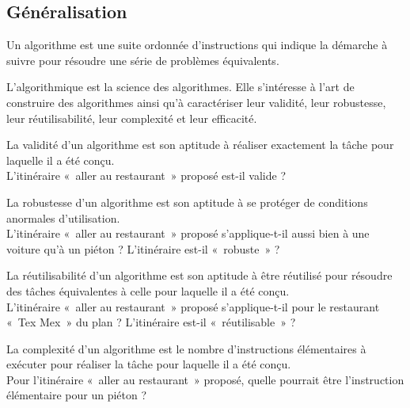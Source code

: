 \subsection{Généralisation}
Un algorithme est une suite ordonnée d'instructions qui indique la démarche à suivre pour résoudre une série de problèmes équivalents. 

L'algorithmique est la science des algorithmes. Elle s'intéresse à l'art de construire des algorithmes ainsi qu'à caractériser leur validité, leur robustesse, leur réutilisabilité,
leur complexité et leur efficacité.

\begin{question} 
La validité d'un algorithme est son aptitude à réaliser exactement la tâche
pour laquelle il a été conçu.\\
L'itinéraire «~aller au restaurant~» proposé est-il valide ?
\end{question}

\begin{question} 
La robustesse d'un algorithme est son aptitude à se protéger de conditions 
anormales d'utilisation.\\
L'itinéraire «~aller au restaurant~» proposé s'applique-t-il aussi bien à une voiture qu'à un piéton ?
L'itinéraire est-il «~robuste~» ?
\end{question}

\begin{question} 
La réutilisabilité d'un algorithme est son aptitude à être réutilisé pour résoudre
des tâches équivalentes à celle pour laquelle il a été conçu.\\
L'itinéraire «~aller au restaurant~» proposé s'applique-t-il pour le restaurant «~Tex Mex~» du plan ?
L'itinéraire est-il «~réutilisable~» ?
\end{question}

\begin{question} 
La complexité d'un algorithme est le nombre d'instructions élémentaires à exécuter pour
réaliser la tâche pour laquelle il a été conçu.\\
Pour l'itinéraire «~aller au restaurant~» proposé, quelle pourrait être l'instruction élémentaire pour un piéton ?
\end{question}

